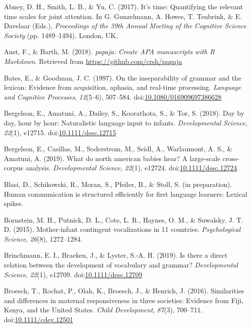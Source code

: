 \documentclass[floatsintext,man]{apa6}
\theoremstyle{definition}
\theoremstyle{definition}
\theoremstyle{definition}
\theoremstyle{remark}
\begin{document}
\hypertarget{refs}{}
\hypertarget{ref-abney2017time}{}
Abney, D. H., Smith, L. B., \& Yu, C. (2017). It's time: Quantifying the
relevant time scales for joint attention. In G. Gunzelmann, A. Howes, T.
Tenbrink, \& E. Davelaar (Eds.), \emph{Proceedings of the 39th Annual
Meeting of the Cognitive Science Society} (pp. 1489--1494). London, UK.

\hypertarget{ref-R-papaja}{}
Aust, F., \& Barth, M. (2018). \emph{papaja: Create APA manuscripts with
R Markdown}. Retrieved from \url{https://github.com/crsh/papaja}

\hypertarget{ref-bates1997inseparability}{}
Bates, E., \& Goodman, J. C. (1997). On the inseparability of grammar
and the lexicon: Evidence from acquisition, aphasia, and real-time
processing. \emph{Language and Cognitive Processes}, \emph{12}(5--6),
507--584.
doi:\href{https://doi.org/10.1080/016909697386628}{10.1080/016909697386628}

\hypertarget{ref-bergelson2018day}{}
Bergelson, E., Amatuni, A., Dailey, S., Koorathota, S., \& Tor, S.
(2018). Day by day, hour by hour: Naturalistic language input to
infants. \emph{Developmental Science}, \emph{22}(1), e12715.
doi:\href{https://doi.org/10.1111/desc.12715}{10.1111/desc.12715}

\hypertarget{ref-bergelsoncasillas2019what}{}
Bergelson, E., Casillas, M., Soderstrom, M., Seidl, A., Warlaumont, A.
S., \& Amatuni, A. (2019). What do north american babies hear? A
large-scale cross-corpus analysis. \emph{Developmental Science},
\emph{22}(1), e12724.
doi:\href{https://doi.org/10.1111/desc.12724}{10.1111/desc.12724}

\hypertarget{ref-blasiIPhuman}{}
Blasi, D., Schikowski, R., Moran, S., Pfeiler, B., \& Stoll, S. (in
preparation). Human communication is structured efficiently for first
language learners: Lexical spikes.

\hypertarget{ref-bornstein2015mother}{}
Bornstein, M. H., Putnick, D. L., Cote, L. R., Haynes, O. M., \&
Suwalsky, J. T. D. (2015). Mother-infant contingent vocalizations in 11
countries. \emph{Psychological Science}, \emph{26}(8), 1272--1284.

\hypertarget{ref-brinchmann2019direct}{}
Brinchmann, E. I., Braeken, J., \& Lyster, S.-A. H. (2019). Is there a
direct relation between the development of vocabulary and grammar?
\emph{Developmental Science}, \emph{22}(1), e12709.
doi:\href{https://doi.org/10.1111/desc.12709}{10.1111/desc.12709}

\hypertarget{ref-broesch2016similarities}{}
Broesch, T., Rochat, P., Olah, K., Broesch, J., \& Henrich, J. (2016).
Similarities and differences in maternal responsiveness in three
societies: Evidence from Fiji, Kenya, and the United States. \emph{Child
Development}, \emph{87}(3), 700--711.
doi:\href{https://doi.org/10.1111/cdev.12501}{10.1111/cdev.12501}
\end{document}
